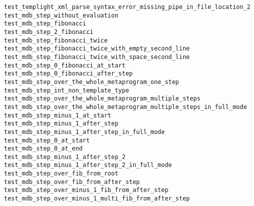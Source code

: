 \begin{description}
    \item[\texttt{test\_templight\_xml\_parse\_syntax\_error\_missing\_pipe\_in\_file\_location\_2}]
    \item[\texttt{test\_mdb\_step\_without\_evaluation}]
    \item[\texttt{test\_mdb\_step\_fibonacci}]
    \item[\texttt{test\_mdb\_step\_2\_fibonacci}]
    \item[\texttt{test\_mdb\_step\_fibonacci\_twice}]
    \item[\texttt{test\_mdb\_step\_fibonacci\_twice\_with\_empty\_second\_line}]
    \item[\texttt{test\_mdb\_step\_fibonacci\_twice\_with\_space\_second\_line}]
    \item[\texttt{test\_mdb\_step\_0\_fibonacci\_at\_start}]
    \item[\texttt{test\_mdb\_step\_0\_fibonacci\_after\_step}]
    \item[\texttt{test\_mdb\_step\_over\_the\_whole\_metaprogram\_one\_step}]
    \item[\texttt{test\_mdb\_step\_int\_non\_template\_type}]
    \item[\texttt{test\_mdb\_step\_over\_the\_whole\_metaprogram\_multiple\_steps}]
    \item[\texttt{test\_mdb\_step\_over\_the\_whole\_metaprogram\_multiple\_steps\_in\_full\_mode}]
    \item[\texttt{test\_mdb\_step\_minus\_1\_at\_start}]
    \item[\texttt{test\_mdb\_step\_minus\_1\_after\_step}]
    \item[\texttt{test\_mdb\_step\_minus\_1\_after\_step\_in\_full\_mode}]
    \item[\texttt{test\_mdb\_step\_0\_at\_start}]
    \item[\texttt{test\_mdb\_step\_0\_at\_end}]
    \item[\texttt{test\_mdb\_step\_minus\_1\_after\_step\_2}]
    \item[\texttt{test\_mdb\_step\_minus\_1\_after\_step\_2\_in\_full\_mode}]
    \item[\texttt{test\_mdb\_step\_over\_fib\_from\_root}]
    \item[\texttt{test\_mdb\_step\_over\_fib\_from\_after\_step}]
    \item[\texttt{test\_mdb\_step\_over\_minus\_1\_fib\_from\_after\_step}]
    \item[\texttt{test\_mdb\_step\_over\_minus\_1\_multi\_fib\_from\_after\_step}]

\end{description}
